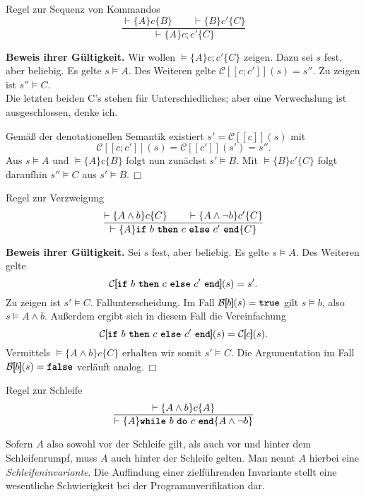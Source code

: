 \documentclass[8pt,fleqn,aspectratio=169]{beamer}
\newcommand{\strong}[1]{\textsf{\textbf{#1}}}
\renewcommand{\qedsymbol}{\ensuremath{\Box}}
\newcommand{\parspace}{\vspace{0.8em}}
\newcommand{\kw}[1]{\textbf{\texttt{#1}}}
\newcommand{\qb}[1]{[\!\![#1]\!\!]}
\newcommand{\evB}{\mathcal B}
\newcommand{\evC}{\mathcal C}
\begin{document}
\begin{frame}
\begin{block}{Regel zur Sequenz von Kommandos}
\[\dfrac{\vdash\{A\}c\{B\}\qquad \vdash\{B\}c'\{C\}}{\vdash\{A\}c; c'\{C\}}\]
\end{block}\pause
\strong{Beweis ihrer Gültigkeit.} Wir wollen $\models\{A\} c; c'\{C\}$ zeigen.
Dazu sei $s$ fest, aber beliebig. Es gelte $s\models A$. Des Weiteren
gelte $\evC\qb{c;c'}(s)=s''$. Zu zeigen ist $s''\models C$.\\
{\footnotesize Die letzten beiden C's stehen für Unterschiedliches; aber eine
Verwechslung ist ausgeschlossen, denke ich.}\pause

\parspace
Gemäß der denotationellen Semantik existiert $s'=\evC\qb{c}(s)$ mit
\[\evC\qb{c;c'}(s) = \evC\qb{c'}(s')=s''.\]
Aus $s\models A$ und $\models\{A\}c\{B\}$ folgt nun zunächst $s'\models B$.
Mit $\models\{B\}c'\{C\}$ folgt daraufhin $s''\models C$ aus
$s'\models B$.\,\qedsymbol
\end{frame}

\begin{frame}
\begin{block}{Regel zur Verzweigung}
\[\dfrac{\vdash\{A\land b\}c\{C\}\qquad\vdash\{A\land\lnot b\}c'\{C\}}{
\vdash\{A\}\text{\kw{if} $b$ \kw{then} $c$ \kw{else} $c'$ \kw{end}}\{C\}}\]
\end{block}\pause
\strong{Beweis ihrer Gültigkeit.} Sei $s$ fest, aber beliebig.
Es gelte $s\models A$. Des Weiteren gelte
\[\evC\qb{\text{\kw{if} $b$ \kw{then} $c$ \kw{else} $c'$ \kw{end}}}(s) = s'.\]
Zu zeigen ist $s'\models C$.\pause{} Fallunterscheidung. Im Fall
$\evB\qb{b}(s)=\kw{true}$ gilt $s\models b$, also $s\models A\land b$.
Außerdem ergibt sich in diesem Fall die Vereinfachung
\[\evC\qb{\text{\kw{if} $b$ \kw{then} $c$ \kw{else} $c'$ \kw{end}}}(s) = \evC\qb{c}(s).\]
Vermittels $\models\{A\land b\}c\{C\}$ erhalten wir somit $s'\models C$.
Die Argumentation im Fall $\evB\qb{b}(s)=\kw{false}$ verläuft analog.\,\qedsymbol
\end{frame}

\begin{frame}
\begin{block}{Regel zur Schleife}
\[\dfrac{\vdash\{A\land b\}c\{A\}}{
\vdash\{A\}\text{\kw{while} $b$ \kw{do} $c$ \kw{end}}\{A\land\lnot b\}}\]
\end{block}\pause
Sofern $A$ also sowohl vor der Schleife gilt, als auch vor und hinter
dem Schleifenrumpf, muss $A$ auch hinter der Schleife gelten. Man nennt
$A$ hierbei eine \emph{Schleifeninvariante}. Die Auffindung einer
zielführenden Invariante stellt eine wesentliche Schwierigkeit bei der
Programmverifikation dar.
\end{frame}
\end{document}
